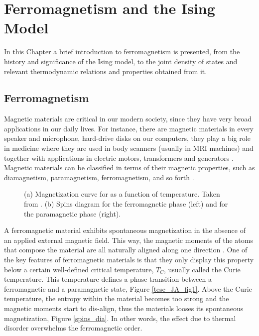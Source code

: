 \chapter{Ferromagnetism and the Ising Model}

In this Chapter  a brief introduction to ferromagnetism is presented, from the history and significance of the Ising model, to the joint density of states and relevant thermodynamic relations and properties obtained from it.

\section{Ferromagnetism}

Magnetic materials are critical in our modern society, since they have very broad applications in our daily lives. For instance, there are magnetic materials in every speaker and microphone, hard-drive disks on our computers, they play a big role in medicine where they are used in body scanners (usually in MRI machines) and together with applications in electric motors, transformers and generators \cite{Gutfleisch2011}. Magnetic materials can be classified in terms of their magnetic properties, such as diamagnetism, paramagnetism, ferromagnetism, and so forth \cite{Griffiths}. 

\begin{figure}[ht]
\centering
{}
\quad
\quad
\quad
{}

\caption{(a) Magnetization curve for  as a function of temperature. Taken  from \cite{tese_JA}. (b) Spins diagram for the ferromagnetic phase (left) and for the paramagnetic phase (right).}
\end{figure}

A ferromagnetic material exhibits spontaneous magnetization in the absence of an applied external magnetic field. This way, the magnetic moments of the atoms that compose the material are all naturally aligned along one direction \cite{magnetism_book}. One of the key features of ferromagnetic materials is that they only display this property below a certain well-defined critical temperature, $T_C$, usually called the Curie temperature. This temperature defines a phase transition between a ferromagnetic and a paramagnetic state, Figure \ref{tese_JA_fig1}. 
Above the Curie temperature, the entropy within the material becomes too strong and the magnetic moments start to dis-align, thus the materials looses its spontaneous magnetization, Figure \ref{spins_dia}.  In other words, the effect due to thermal disorder overwhelms the ferromagnetic order.

